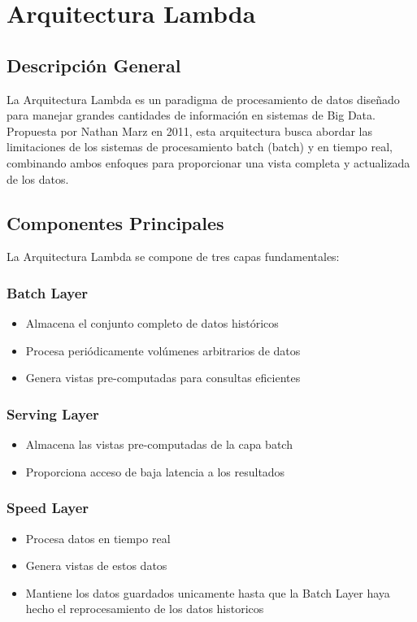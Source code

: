 \section{Arquitectura Lambda}

\subsection{Descripción General}
La Arquitectura Lambda es un paradigma de procesamiento de datos diseñado para manejar grandes cantidades de información en sistemas de Big Data. 
Propuesta por Nathan Marz en 2011, esta arquitectura busca abordar las limitaciones de los sistemas de procesamiento batch (batch) y en tiempo real, 
combinando ambos enfoques para proporcionar una vista completa y actualizada de los datos.

\subsection{Componentes Principales}
La Arquitectura Lambda se compone de tres capas fundamentales:

\subsubsection{Batch Layer}
\begin{itemize}
\item Almacena el conjunto completo de datos históricos
\item Procesa periódicamente volúmenes arbitrarios de datos
\item Genera vistas pre-computadas para consultas eficientes
\end{itemize}

\subsubsection{Serving Layer}
\begin{itemize}
\item Almacena las vistas pre-computadas de la capa batch
\item Proporciona acceso de baja latencia a los resultados
\end{itemize}

\subsubsection{Speed Layer}
\begin{itemize}
\item Procesa datos en tiempo real
\item Genera vistas de estos datos
\item Mantiene los datos guardados unicamente hasta que la Batch Layer haya hecho el reprocesamiento de los datos historicos
\end{itemize}


